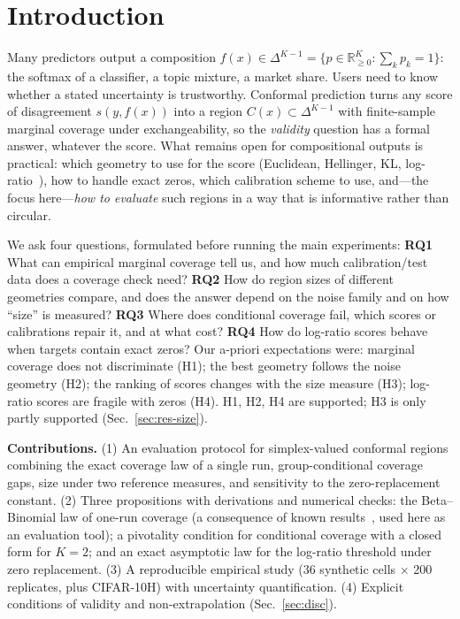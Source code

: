 \documentclass{article}
\theoremstyle{plain}
\theoremstyle{remark}
\newcommand{\simplex}{\Delta^{K-1}}
\newcommand{\R}{\mathbb{R}}
\begin{document}
\section{Introduction}
\label{sec:intro}
Many predictors output a composition $f(x)\in\simplex=\{p\in\R^K_{\ge0}:\sum_k p_k=1\}$: the softmax of a classifier, a topic mixture, a market share. Users need to know whether a stated uncertainty is trustworthy. Conformal prediction \citep{vovk2005,lei2018,angelopoulos2021gentle} turns any score of disagreement $s(y,f(x))$ into a region $C(x)\subset\simplex$ with finite-sample marginal coverage under exchangeability, so the \emph{validity} question has a formal answer, whatever the score. What remains open for compositional outputs is practical: which geometry to use for the score (Euclidean, Hellinger, KL, log-ratio~\citep{aitchison1982}), how to handle exact zeros, which calibration scheme to use, and---the focus here---\emph{how to evaluate} such regions in a way that is informative rather than circular.

We ask four questions, formulated before running the main experiments: \textbf{RQ1} What can empirical marginal coverage tell us, and how much calibration/test data does a coverage check need? \textbf{RQ2} How do region sizes of different geometries compare, and does the answer depend on the noise family and on how ``size'' is measured? \textbf{RQ3} Where does conditional coverage fail, which scores or calibrations repair it, and at what cost? \textbf{RQ4} How do log-ratio scores behave when targets contain exact zeros? Our a-priori expectations were: marginal coverage does not discriminate (H1); the best geometry follows the noise geometry (H2); the ranking of scores changes with the size measure (H3); log-ratio scores are fragile with zeros (H4). H1, H2, H4 are supported; H3 is only partly supported (Sec.~\ref{sec:res-size}).

\textbf{Contributions.} (1) An evaluation protocol for simplex-valued conformal regions combining the exact coverage law of a single run, group-conditional coverage gaps, size under two reference measures, and sensitivity to the zero-replacement constant. (2) Three propositions with derivations and numerical checks: the Beta--Binomial law of one-run coverage (a consequence of known results~\citep{vovk2012conditional}, used here as an evaluation tool); a pivotality condition for conditional coverage with a closed form for $K{=}2$; and an exact asymptotic law for the log-ratio threshold under zero replacement. (3) A reproducible empirical study (36 synthetic cells $\times$ 200 replicates, plus CIFAR-10H) with uncertainty quantification. (4) Explicit conditions of validity and non-extrapolation (Sec.~\ref{sec:disc}).
\end{document}
